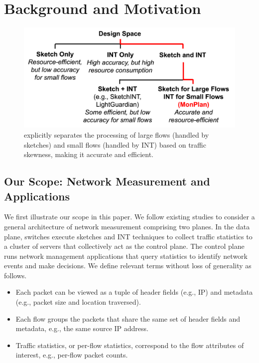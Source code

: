 \section{Background and Motivation}\label{background}

\begin{figure}
    \centering
    \includegraphics[width=\linewidth]{pics/DesignSpace.png}
    \caption{\sysname explicitly separates the processing of large flows (handled by sketches) and small flows (handled by INT) based on traffic skewness, making it accurate and efficient.}
    \label{DesignSpace}
\end{figure}

\subsection{Our Scope: Network Measurement and Applications}

We first illustrate our scope in this paper. We follow existing studies \cite{namkung2022sketchlib,anup2022hetero,liu2016one} to consider a general architecture of network measurement comprising two planes. In the data plane, switches execute sketches and INT techniques to collect traffic statistics to a cluster of servers that collectively act as the control plane. The control plane runs network management applications that query statistics to identify network events and make decisions. We define relevant terms without loss of generality as follows.

\begin{itemize}[leftmargin=*]
%
    \item Each packet can be viewed as a tuple of header fields (e.g., IP) and metadata (e.g., packet size and location traversed).
%
    \item Each flow groups the packets that share the same set of header fields and metadata, e.g., the same source IP address. 
%
    \item Traffic statistics, or per-flow statistics, correspond to the flow attributes of interest, e.g., per-flow packet counts. 
%
\end{itemize}


